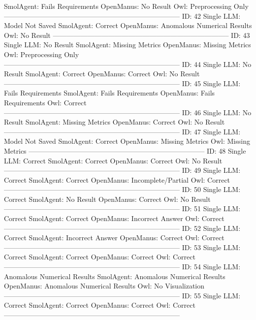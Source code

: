 \begin{tcolorbox}[colback=cadmiumgreen!5!white,colframe=forestgreen!75!white,breakable,title=\textit{Human evaluation results in task 4.}]
\begin{VerbatimWrap}
SmolAgent: Fails Requirements 
OpenManus: No Result 
Owl: Preprocessing Only 
-----------------------------------------------------------------------------
ID: 42 
Single LLM: Model Not Saved 
SmolAgent: Correct 
OpenManus: Anomalous Numerical Results 
Owl: No Result 
-----------------------------------------------------------------------------
ID: 43 
Single LLM: No Result 
SmolAgent: Missing Metrics 
OpenManus: Missing Metrics 
Owl: Preprocessing Only 
-----------------------------------------------------------------------------
ID: 44 
Single LLM: No Result 
SmolAgent: Correct 
OpenManus: Correct 
Owl: No Result 
-----------------------------------------------------------------------------
ID: 45 
Single LLM: Fails Requirements 
SmolAgent: Fails Requirements 
OpenManus: Fails Requirements 
Owl: Correct 
-----------------------------------------------------------------------------
ID: 46 
Single LLM: No Result 
SmolAgent: Missing Metrics 
OpenManus: Correct 
Owl: No Result 
-----------------------------------------------------------------------------
ID: 47 
Single LLM: Model Not Saved 
SmolAgent: Correct 
OpenManus: Missing Metrics 
Owl: Missing Metrics 
-----------------------------------------------------------------------------
ID: 48 
Single LLM: Correct 
SmolAgent: Correct 
OpenManus: Correct 
Owl: No Result 
-----------------------------------------------------------------------------
ID: 49 
Single LLM: Correct 
SmolAgent: Correct 
OpenManus: Incomplete/Partial 
Owl: Correct 
-----------------------------------------------------------------------------
ID: 50 
Single LLM: Correct 
SmolAgent: No Result 
OpenManus: Correct 
Owl: No Result 
-----------------------------------------------------------------------------
ID: 51 
Single LLM: Correct 
SmolAgent: Correct 
OpenManus: Incorrect Answer 
Owl: Correct 
-----------------------------------------------------------------------------
ID: 52 
Single LLM: Correct 
SmolAgent: Incorrect Answer 
OpenManus: Correct 
Owl: Correct 
-----------------------------------------------------------------------------
ID: 53 
Single LLM: Correct 
SmolAgent: Correct 
OpenManus: Correct 
Owl: Correct 
-----------------------------------------------------------------------------
ID: 54 
Single LLM: Anomalous Numerical Results 
SmolAgent: Anomalous Numerical Results 
OpenManus: Anomalous Numerical Results 
Owl: No Visualization 
-----------------------------------------------------------------------------
ID: 55 
Single LLM: Correct 
SmolAgent: Correct 
OpenManus: Correct 
Owl: Correct 
-----------------------------------------------------------------------------

\end{VerbatimWrap}
\end{tcolorbox}
